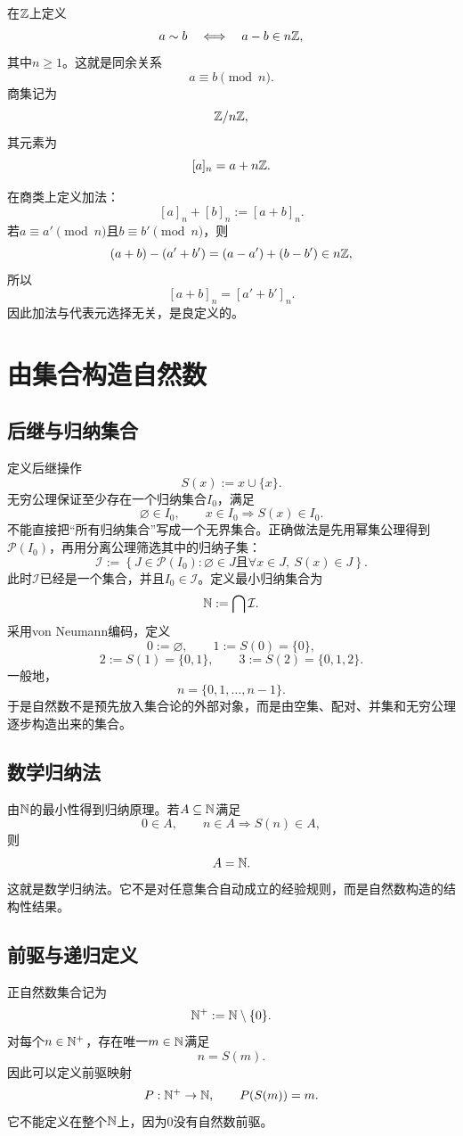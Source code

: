 在$\mathbb{Z}$上定义
\[
    a\sim b
    \quad\Longleftrightarrow\quad
    a-b\in n\mathbb{Z},
\]
其中$n\ge1$。这就是同余关系
\[
    a\equiv b\pmod n.
\]
商集记为
\[
    \mathbb{Z}/n\mathbb{Z},
\]
其元素为
\[
    [a]_n=a+n\mathbb{Z}.
\]

在商类上定义加法：
\[
    [a]_n+[b]_n:=[a+b]_n.
\]
若$a\equiv a'\pmod n$且$b\equiv b'\pmod n$，则
\[
    (a+b)-(a'+b')=(a-a')+(b-b')\in n\mathbb{Z},
\]
所以
\[
    [a+b]_n=[a'+b']_n.
\]
因此加法与代表元选择无关，是良定义的。


\section{由集合构造自然数}

\subsection{后继与归纳集合}

定义后继操作
\[
    S(x):=x\cup\{x\}.
\]
无穷公理保证至少存在一个归纳集合$I_0$，满足
\[
    \varnothing\in I_0,
    \qquad
    x\in I_0\Rightarrow S(x)\in I_0.
\]
不能直接把“所有归纳集合”写成一个无界集合。正确做法是先用幂集公理得到$\mathcal P(I_0)$，再用分离公理筛选其中的归纳子集：
\[
    \mathcal I
    :=\left\{
    J\in\mathcal P(I_0):
    \varnothing\in J\text{且}
    \forall x\in J,\ S(x)\in J
    \right\}.
\]
此时$\mathcal I$已经是一个集合，并且$I_0\in\mathcal I$。定义最小归纳集合为
\[
    \mathbb{N}:=\bigcap\mathcal I.
\]
采用von Neumann编码，定义
\[
    0:=\varnothing,
    \qquad
    1:=S(0)=\{0\},
\]
\[
    2:=S(1)=\{0,1\},
    \qquad
    3:=S(2)=\{0,1,2\}.
\]
一般地，
\[
    n=\{0,1,\ldots,n-1\}.
\]
于是自然数不是预先放入集合论的外部对象，而是由空集、配对、并集和无穷公理逐步构造出来的集合。

\subsection{数学归纳法}

由$\mathbb{N}$的最小性得到归纳原理。若$A\subseteq\mathbb{N}$满足
\[
    0\in A,
    \qquad
    n\in A\Rightarrow S(n)\in A,
\]
则
\[
    A=\mathbb{N}.
\]
这就是数学归纳法。它不是对任意集合自动成立的经验规则，而是自然数构造的结构性结果。

\subsection{前驱与递归定义}

正自然数集合记为
\[
    \mathbb{N}^+:=\mathbb{N}\setminus\{0\}.
\]
对每个$n\in\mathbb{N}^+$，存在唯一$m\in\mathbb{N}$满足
\[
    n=S(m).
\]
因此可以定义前驱映射
\[
    P:\mathbb{N}^+\to\mathbb{N},
    \qquad
    P(S(m))=m.
\]
它不能定义在整个$\mathbb{N}$上，因为$0$没有自然数前驱。

